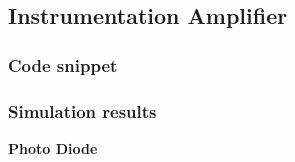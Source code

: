 \documentclass[12pt]{article}
\begin{document}
\subsection{Instrumentation Amplifier}
\subsubsection{Code snippet}



\subsubsection{Simulation results}
\textbf{\large Photo Diode}
\begin{figure}[H]
  \begin{center}
\end{center}
\end{figure}

\begin{figure}[H]
    \begin{center}
\end{center}
\end{figure}
\end{document}
